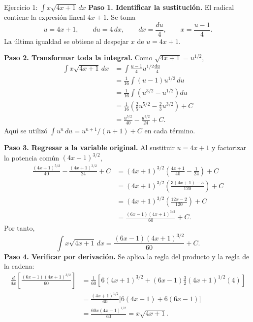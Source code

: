 \begin{activitybox}{Ejercicio 1: $\displaystyle \int x\sqrt{4x+1}\,dx$}
\textbf{Paso 1. Identificar la sustitución.} El radical contiene la expresión lineal
$4x+1$. Se toma
\[
 u=4x+1,\qquad du=4\,dx,\qquad dx=\frac{du}{4},\qquad x=\frac{u-1}{4}.
\]
La última igualdad se obtiene al despejar $x$ de $u=4x+1$.

\textbf{Paso 2. Transformar toda la integral.} Como $\sqrt{4x+1}=u^{1/2}$,
\begin{align*}
 \int x\sqrt{4x+1}\,dx
 &=\int \frac{u-1}{4}u^{1/2}\frac{du}{4}\\
 &=\frac1{16}\int(u-1)u^{1/2}\,du\\
 &=\frac1{16}\int\left(u^{3/2}-u^{1/2}\right)du\\
 &=\frac1{16}\left(\frac25u^{5/2}-\frac23u^{3/2}\right)+C\\
 &=\frac{u^{5/2}}{40}-\frac{u^{3/2}}{24}+C.
\end{align*}
Aquí se utilizó $\int u^n\,du=u^{n+1}/(n+1)+C$ en cada término.

\textbf{Paso 3. Regresar a la variable original.} Al sustituir $u=4x+1$ y
factorizar la potencia común $(4x+1)^{3/2}$,
\begin{align*}
 \frac{(4x+1)^{5/2}}{40}-\frac{(4x+1)^{3/2}}{24}+C
 &=(4x+1)^{3/2}\left(\frac{4x+1}{40}-\frac1{24}\right)+C\\
 &=(4x+1)^{3/2}\left(\frac{3(4x+1)-5}{120}\right)+C\\
 &=(4x+1)^{3/2}\left(\frac{12x-2}{120}\right)+C\\
 &=\frac{(6x-1)(4x+1)^{3/2}}{60}+C.
\end{align*}
Por tanto,
\[
 \boxed{\int x\sqrt{4x+1}\,dx
 =\frac{(6x-1)(4x+1)^{3/2}}{60}+C}.
\]
\textbf{Paso 4. Verificar por derivación.} Se aplica la regla del producto y la
regla de la cadena:
\begin{align*}
 \frac{d}{dx}\left[\frac{(6x-1)(4x+1)^{3/2}}{60}\right]
 &=\frac1{60}\left[6(4x+1)^{3/2}
 +(6x-1)\frac32(4x+1)^{1/2}(4)\right]\\
 &=\frac{(4x+1)^{1/2}}{60}\bigl[6(4x+1)+6(6x-1)\bigr]\\
 &=\frac{60x(4x+1)^{1/2}}{60}
 =x\sqrt{4x+1}.
\end{align*}
\end{activitybox}


